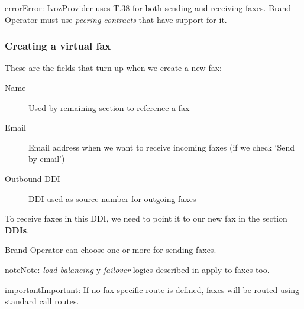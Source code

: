 \documentclass[letterpaper,10pt,english]{sphinxmanual}
\begin{document}
\begin{notice}{error}{Error:}
IvozProvider uses
\href{http://www.voip-info.org/wiki/view/T.38}{T.38} for both sending and receiving
faxes. Brand Operator must use \emph{peering contracts} that have support for it.
\end{notice}


\subsubsection{Creating a virtual fax}
\label{administration_portal/client/vpbx/faxes:creating-a-virtual-fax}
These are the fields that turn up when we create a new fax:
\begin{description}
\item[{Name}] \leavevmode{}\label{administration_portal/client/vpbx/faxes:term-name}
Used by remaining section to reference a fax

\item[{Email}] \leavevmode{}\label{administration_portal/client/vpbx/faxes:term-email}
Email address when we want to receive incoming faxes (if we check `Send
by email')

\item[{Outbound DDI}] \leavevmode{}\label{administration_portal/client/vpbx/faxes:term-outbound-ddi}
DDI used as source number for outgoing faxes

\end{description}

To receive faxes in this DDI, we need to point it to our new fax in the section
\textbf{DDIs}.

Brand Operator can choose one or more {\hyperref[administration_portal/brand/routing/outgoing_routings:outgoing\string-routings]{}} for sending faxes.

\begin{notice}{note}{Note:}
\emph{load-balancing} y \emph{failover} logics described in {\hyperref[administration_portal/brand/routing/outgoing_routings:outgoing\string-routings]{}}
apply to faxes too.
\end{notice}

\begin{notice}{important}{Important:}
If no fax-specific route is defined, faxes will be routed using
standard call routes.
\end{notice}
\end{document}
